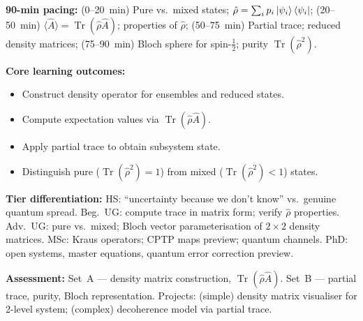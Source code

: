 \documentclass[11pt,a4paper]{article}
\begin{document}
\medskip
\begin{tcolorbox}[modulebox, title={Module~I.2 --- Lecture L11: Density Operators, Mixed States \& Partial Trace}]
\textbf{90-min pacing:} (0--20~min) Pure vs.\ mixed states;
$\hat{\rho}=\sum_i p_i\ket{\psi_i}\bra{\psi_i}$;
(20--50~min) $\langle\hat{A}\rangle=\operatorname{Tr}(\hat{\rho}\hat{A})$; properties of $\hat{\rho}$;
(50--75~min) Partial trace; reduced density matrices;
(75--90~min) Bloch sphere for spin-$\tfrac{1}{2}$; purity $\operatorname{Tr}(\hat{\rho}^2)$.

\medskip\textbf{Core learning outcomes:}
\begin{itemize}[leftmargin=1.4em,topsep=2pt,itemsep=1pt]
  \item Construct density operator for ensembles and reduced states.
  \item Compute expectation values via $\operatorname{Tr}(\hat{\rho}\hat{A})$.
  \item Apply partial trace to obtain subsystem state.
  \item Distinguish pure ($\operatorname{Tr}(\hat{\rho}^2)=1$) from mixed ($\operatorname{Tr}(\hat{\rho}^2)<1$) states.
\end{itemize}

\medskip\textbf{Tier differentiation:}
HS: ``uncertainty because we don't know'' vs.\ genuine quantum spread.
Beg.\ UG: compute trace in matrix form; verify $\hat{\rho}$ properties.
Adv.\ UG: pure vs.\ mixed; Bloch vector parameterisation of $2\times 2$ density matrices.
MSc: Kraus operators; CPTP maps preview; quantum channels.
PhD: open systems, master equations, quantum error correction preview.

\medskip\textbf{Assessment:}
Set~A --- density matrix construction, $\operatorname{Tr}(\hat{\rho}\hat{A})$.
Set~B --- partial trace, purity, Bloch representation.
Projects: (simple) density matrix visualiser for 2-level system; (complex) decoherence model via partial trace.
\end{tcolorbox}
\end{document}
